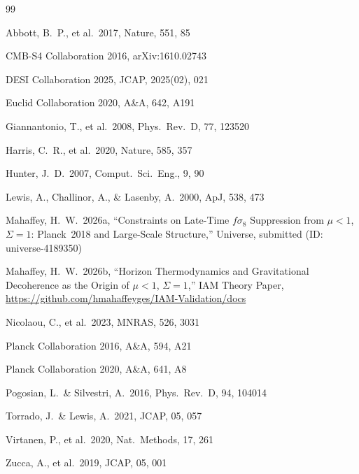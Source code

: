 \documentclass[12pt,a4paper]{article}
\begin{document}
\begin{thebibliography}{99}

 Abbott, B.\ P., et al.\ 2017, Nature, 551, 85

 CMB-S4 Collaboration 2016, arXiv:1610.02743

 DESI Collaboration 2025, JCAP, 2025(02), 021

 Euclid Collaboration 2020, A\&A, 642, A191

 Giannantonio, T., et al.\ 2008, Phys.\ Rev.\ D, 77, 123520

 Harris, C.\ R., et al.\ 2020, Nature, 585, 357

 Hunter, J.\ D.\ 2007, Comput.\ Sci.\ Eng., 9, 90

 Lewis, A., Challinor, A., \& Lasenby, A.\ 2000, ApJ, 538, 473

 Mahaffey, H.\ W.\ 2026a, ``Constraints on Late-Time
$f\sigma_8$ Suppression from $\mu < 1$, $\Sigma = 1$: Planck~2018 and
Large-Scale Structure,'' Universe, submitted (ID: universe-4189350)

 Mahaffey, H.\ W.\ 2026b, ``Horizon Thermodynamics
and Gravitational Decoherence as the Origin of $\mu < 1$, $\Sigma = 1$,''
IAM Theory Paper, \url{https://github.com/hmahaffeyges/IAM-Validation/docs}

 Nicolaou, C., et al.\ 2023, MNRAS, 526, 3031

 Planck Collaboration 2016, A\&A, 594, A21

 Planck Collaboration 2020, A\&A, 641, A8

 Pogosian, L.\ \& Silvestri, A.\ 2016,
Phys.\ Rev.\ D, 94, 104014

 Torrado, J.\ \& Lewis, A.\ 2021, JCAP, 05, 057

 Virtanen, P., et al.\ 2020, Nat.\ Methods, 17, 261

 Zucca, A., et al.\ 2019, JCAP, 05, 001

\end{thebibliography}
\end{document}
